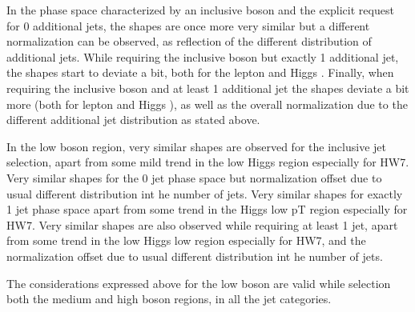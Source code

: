 In the phase space characterized by an inclusive boson \pt and the explicit request for 0 additional jets,
the shapes are once more very similar but a different normalization can be observed, as reflection of the
different distribution of additional jets.
While requiring the inclusive boson \pt but exactly 1 additional jet,
the \pt shapes start to deviate a bit, both for the lepton \pt and Higgs \pt.
Finally, when requiring the inclusive boson \pt and at least 1 additional jet
the \pt shapes deviate a bit more (both for lepton \pt and Higgs \pt), as well as the
overall normalization due to the different additional jet distribution as stated above.

In the low boson \pt region, very similar shapes are observed for the inclusive jet selection,
apart from some mild trend in the low Higgs \pt region especially for HW7.
Very similar shapes for the 0 jet phase space but normalization offset due to usual different distribution int he number of jets.
Very similar shapes for exactly 1 jet phase space apart from some trend in the Higgs low pT region especially for HW7.
Very similar shapes are also observed while requiring at least 1 jet, apart from some trend in the low Higgs low \pt region especially for HW7,
and the normalization offset due to usual different distribution int he number of jets.

The considerations expressed above for the low boson \pt are valid while selection both the medium and high boson \pt regions,
in all the jet categories.



